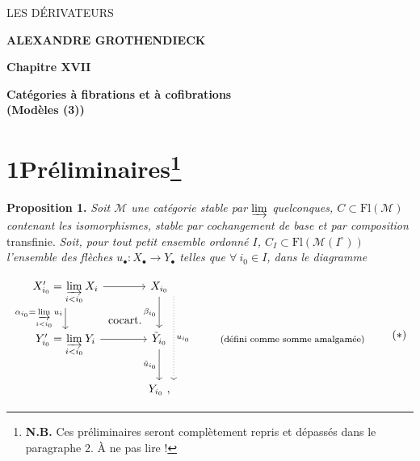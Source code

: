 \documentclass[11pt]{article}
\newcommand{\printedpage}[1]{\marginpar{\footnotesize p.~#1}}
\newcommand{\msp}[1]{\marginpar{\footnotesize [#1]}}
\newcommand{\Fl}{\mathrm{Fl}}
\begin{document}
\printedpage{--}

\begin{center}
\vspace*{5cm}

{\Large\textsf{LES DÉRIVATEURS}}

\bigskip

\textbf{ALEXANDRE GROTHENDIECK}

\vspace{2cm}

\textbf{Chapitre XVII}

\medskip

\textbf{Catégories à fibrations et à cofibrations}\\
\textbf{(Modèles (3))}
\end{center}

\clearpage

\printedpage{--}

\vspace*{5cm}


\clearpage

\printedpage{1}

\msp{page 1}

\section*{1\quad Préliminaires\footnote{\textbf{N.B.} Ces préliminaires seront complètement repris et dépassés dans le paragraphe 2. À ne pas lire !}}

\textbf{Proposition 1.} \textit{Soit $\mathcal{M}$ une catégorie stable par $\varinjlim$ quelconques, $C \subset \Fl(\mathcal{M})$ contenant les isomorphismes, stable par cochangement de base et par composition} transfinie. \textit{Soit, pour tout petit ensemble ordonné $I$, $C_I \subset \Fl(\mathcal{M}(I^{\circ}))$ l'ensemble des flèches $u_\bullet : X_\bullet \longrightarrow Y_\bullet$ telles que $\forall\ i_0 \in I$, dans le diagramme} %

\[
\begin{tikzcd}[column sep=large]
X'_{i_0} = \varinjlim\limits_{i<i_0} X_i \arrow[r] \arrow[d, "\alpha_{i_0} = \varinjlim\limits_{i<i_0} u_i"'] \arrow[dr, phantom, "\text{cocart.}"] & X_{i_0} \arrow[d, "\beta_{i_0}"'] \arrow[dd, dotted, shift left=3ex, "u_{i_0}"] & \\
Y'_{i_0} = \varinjlim\limits_{i<i_0} Y_i \arrow[r] & \tilde{Y}_{i_0} \arrow[d, "\tilde{u}_{i_0}"'] & \text{\footnotesize (défini comme somme amalgamée)} \\
& Y_{i_0}\ , &
\end{tikzcd}
\tag*{$(*)$}
\]
\end{document}
